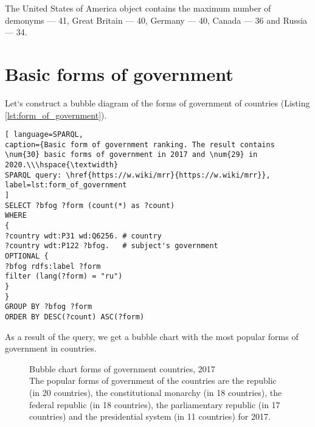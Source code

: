 
The United States of America object contains the maximum number of demonyms --- 41, Great Britain --- 40, Germany --- 40, Canada --- 36 and Russia --- 34.

\section{Basic forms of government}

Let`s construct a bubble diagram of the forms of government of countries (Listing \ref{lst:form_of_government}).

\begin{lstlisting}[ language=SPARQL, 
caption={Basic form of government ranking. The result contains \num{30} basic forms of government in 2017 and \num{29} in 2020.\\\hspace{\textwidth}
SPARQL query: \href{https://w.wiki/mrr}{https://w.wiki/mrr}},
label=lst:form_of_government
]
SELECT ?bfog ?form (count(*) as ?count)
WHERE 
{
?country wdt:P31 wd:Q6256. # country
?country wdt:P122 ?bfog.   # subject's government
OPTIONAL {
?bfog rdfs:label ?form
filter (lang(?form) = "ru")
}
}
GROUP BY ?bfog ?form
ORDER BY DESC(?count) ASC(?form)
\end{lstlisting}


As a result of the query, we get a bubble chart with the most popular forms of government in countries.

\begin{figure}
	{
		\setlength{\fboxsep}{0pt}%
		\setlength{\fboxrule}{1pt}%
	}
	\caption{Bubble chart forms of government countries, 2017
		\\ The popular forms of government of the countries are the republic (in 20 countries), the constitutional monarchy (in 18 countries), the federal republic (in 18 countries), the parliamentary republic (in 17 countries) and the presidential system (in 11 countries) for 2017.
	}%
	\label{fig:bubble_chart_forms_of_government_countries_2017}%
\end{figure}

